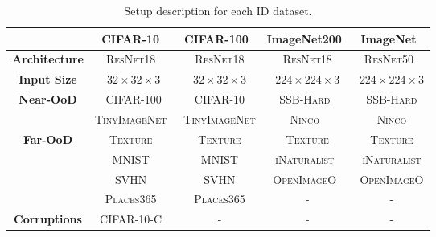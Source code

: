 \documentclass[10pt,twocolumn,a4paper]{article}
\begin{document}
\begin{table*}[t]
    \centering
    \begin{tabular}{c@{\hskip 0.2in}c@{\hskip 0.2in}c@{\hskip 0.2in}c@{\hskip 0.2in}c}
     \toprule
     &\textbf{CIFAR-10}~\cite{krizhevsky2009learning} & \textbf{CIFAR-100}~\cite{krizhevsky2009learning} & \textbf{ImageNet200}~\cite{deng2009imagenet} & \textbf{ImageNet}~\cite{deng2009imagenet}
     \\
     \midrule
    \multirow{1}{*}{\textbf{Architecture}} & \textsc{ResNet18}~\cite{nguyen2015deep} & \textsc{ResNet18} & \textsc{ResNet18} & \textsc{ResNet50}~\cite{nguyen2015deep} \\
    \midrule
    \textbf{Input Size} & $32\!\times\!32\!\times\!3$ & $32\!\times\!32\!\times\!3$ & $224\!\times\!224\!\times\!3$ & $224\!\times\!224\!\times\!3$ \\
    \midrule
    \multirow{2}{*}{\textbf{Near-OoD}} 
    & \textsc{CIFAR-100} & \textsc{CIFAR-10} & \textsc{SSB-Hard}~\cite{zhang2024openood} & \textsc{SSB-Hard} \\ 
    & \textsc{TinyImageNet}~\cite{deng2009imagenet} & \textsc{TinyImageNet} & \textsc{Ninco}~\cite{bitterwolf2023ninco} & \textsc{Ninco} \\
     \midrule
    \multirow{4}{*}{\textbf{Far-OoD}} 
    & \textsc{Texture}~\cite{cimpoi14describing} & \textsc{Texture} & \textsc{Texture} & \textsc{Texture} \\
    & \textsc{MNIST}~\cite{deng2012mnist} & \textsc{MNIST} & \textsc{iNaturalist}~\cite{DBLP:journals/corr/HornASSAPB17} & \textsc{iNaturalist} \\
    & \textsc{SVHN}~\cite{netzer2011reading} & \textsc{SVHN} & \textsc{OpenImageO}~\cite{Wang2022ViMOW} & \textsc{OpenImageO} \\
    & \textsc{Places365}~\cite{Zhou2018PlacesA1} & \textsc{Places365} & - & - \\
     \midrule
    \textbf{Corruptions} & \textsc{CIFAR-10-C}~\cite{hendrycks2018benchmarking} & - & - & - \\
    \bottomrule
    \end{tabular}
    \caption{\label{tab:architectures}Setup description for each ID dataset.}
\end{table*}
\end{document}
